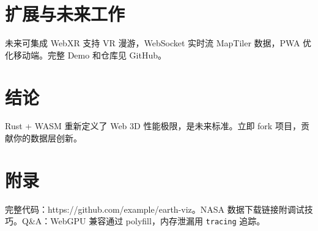 \chapter{扩展与未来工作}
未来可集成 WebXR 支持 VR 漫游，WebSocket 实时流 MapTiler 数据，PWA 优化移动端。完整 Demo 和仓库见 GitHub。\par
\chapter{结论}
Rust + WASM 重新定义了 Web 3D 性能极限，是未来标准。立即 fork 项目，贡献你的数据层创新。\par
\chapter{附录}
完整代码：https://github.com/example/earth-viz。NASA 数据下载链接附调试技巧。Q\&{}A：WebGPU 兼容通过 polyfill，内存泄漏用 \texttt{tracing} 追踪。\par
